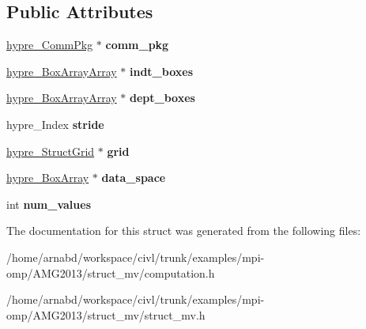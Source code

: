 \subsection*{Public Attributes}
\begin{DoxyCompactItemize}
\item 
\hypertarget{structhypre__ComputePkg__struct_a0ab672784bb6a56586e6184eb0f46221}{}\hyperlink{structhypre__CommPkg__struct}{hypre\+\_\+\+Comm\+Pkg} $\ast$ {\bfseries comm\+\_\+pkg}\label{structhypre__ComputePkg__struct_a0ab672784bb6a56586e6184eb0f46221}

\item 
\hypertarget{structhypre__ComputePkg__struct_a14cd0675489f67297538391a333ce4bb}{}\hyperlink{structhypre__BoxArrayArray__struct}{hypre\+\_\+\+Box\+Array\+Array} $\ast$ {\bfseries indt\+\_\+boxes}\label{structhypre__ComputePkg__struct_a14cd0675489f67297538391a333ce4bb}

\item 
\hypertarget{structhypre__ComputePkg__struct_a3466b0b994d4aa07fa3565c2b2e439bf}{}\hyperlink{structhypre__BoxArrayArray__struct}{hypre\+\_\+\+Box\+Array\+Array} $\ast$ {\bfseries dept\+\_\+boxes}\label{structhypre__ComputePkg__struct_a3466b0b994d4aa07fa3565c2b2e439bf}

\item 
\hypertarget{structhypre__ComputePkg__struct_a936364d95e67d7b2d81342a995cb2e59}{}hypre\+\_\+\+Index {\bfseries stride}\label{structhypre__ComputePkg__struct_a936364d95e67d7b2d81342a995cb2e59}

\item 
\hypertarget{structhypre__ComputePkg__struct_ac85980db63b34e07f31797a3e6a460f5}{}\hyperlink{structhypre__StructGrid__struct}{hypre\+\_\+\+Struct\+Grid} $\ast$ {\bfseries grid}\label{structhypre__ComputePkg__struct_ac85980db63b34e07f31797a3e6a460f5}

\item 
\hypertarget{structhypre__ComputePkg__struct_a942703ab4662aba0226fe9c081dc2b1e}{}\hyperlink{structhypre__BoxArray__struct}{hypre\+\_\+\+Box\+Array} $\ast$ {\bfseries data\+\_\+space}\label{structhypre__ComputePkg__struct_a942703ab4662aba0226fe9c081dc2b1e}

\item 
\hypertarget{structhypre__ComputePkg__struct_a17eefe44226fc31eb8d92dac97416927}{}int {\bfseries num\+\_\+values}\label{structhypre__ComputePkg__struct_a17eefe44226fc31eb8d92dac97416927}

\end{DoxyCompactItemize}


The documentation for this struct was generated from the following files\+:\begin{DoxyCompactItemize}
\item 
/home/arnabd/workspace/civl/trunk/examples/mpi-\/omp/\+A\+M\+G2013/struct\+\_\+mv/computation.\+h\item 
/home/arnabd/workspace/civl/trunk/examples/mpi-\/omp/\+A\+M\+G2013/struct\+\_\+mv/struct\+\_\+mv.\+h\end{DoxyCompactItemize}
